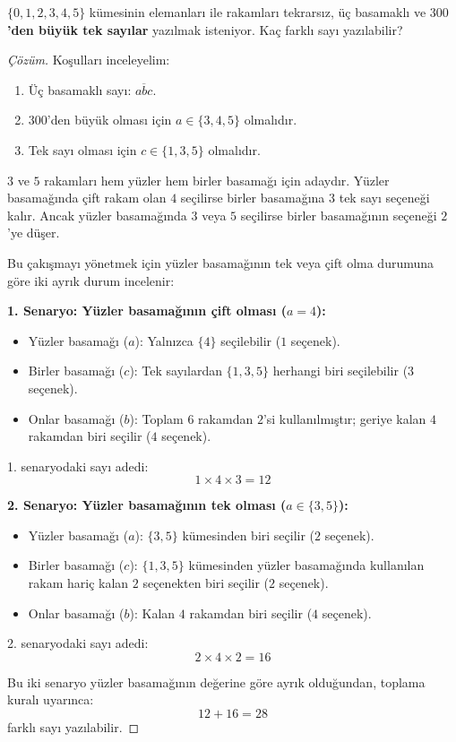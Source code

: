 \begin{example}
$\{0, 1, 2, 3, 4, 5\}$ kümesinin elemanları ile rakamları tekrarsız, üç basamaklı ve \textbf{$300$'den büyük tek sayılar} yazılmak isteniyor. Kaç farklı sayı yazılabilir?
\end{example}
\begin{proof}[Çözüm]
Koşulları inceleyelim:
\begin{enumerate}
  \item Üç basamaklı sayı: $\overline{a b c}$.
  \item $300$'den büyük olması için $a \in \{3, 4, 5\}$ olmalıdır.
  \item Tek sayı olması için $c \in \{1, 3, 5\}$ olmalıdır.
\end{enumerate}
$3$ ve $5$ rakamları hem yüzler hem birler basamağı için adaydır. Yüzler basamağında çift rakam olan $4$ seçilirse birler basamağına $3$ tek sayı seçeneği kalır. Ancak yüzler basamağında $3$ veya $5$ seçilirse birler basamağının seçeneği $2$'ye düşer.

Bu çakışmayı yönetmek için yüzler basamağının tek veya çift olma durumuna göre iki ayrık durum incelenir:

\textbf{1. Senaryo: Yüzler basamağının çift olması ($a = 4$):}
\begin{itemize}
  \item Yüzler basamağı ($a$): Yalnızca $\{4\}$ seçilebilir ($1$ seçenek).
  \item Birler basamağı ($c$): Tek sayılardan $\{1, 3, 5\}$ herhangi biri seçilebilir ($3$ seçenek).
  \item Onlar basamağı ($b$): Toplam $6$ rakamdan $2$'si kullanılmıştır; geriye kalan $4$ rakamdan biri seçilir ($4$ seçenek).
\end{itemize}
1. senaryodaki sayı adedi:
\[ 1 \times 4 \times 3 = 12 \]

\textbf{2. Senaryo: Yüzler basamağının tek olması ($a \in \{3, 5\}$):}
\begin{itemize}
  \item Yüzler basamağı ($a$): $\{3, 5\}$ kümesinden biri seçilir ($2$ seçenek).
  \item Birler basamağı ($c$): $\{1, 3, 5\}$ kümesinden yüzler basamağında kullanılan rakam hariç kalan $2$ seçenekten biri seçilir ($2$ seçenek).
  \item Onlar basamağı ($b$): Kalan $4$ rakamdan biri seçilir ($4$ seçenek).
\end{itemize}
2. senaryodaki sayı adedi:
\[ 2 \times 4 \times 2 = 16 \]

Bu iki senaryo yüzler basamağının değerine göre ayrık olduğundan, toplama kuralı uyarınca:
\[ 12 + 16 = 28 \]
farklı sayı yazılabilir.
\end{proof}

